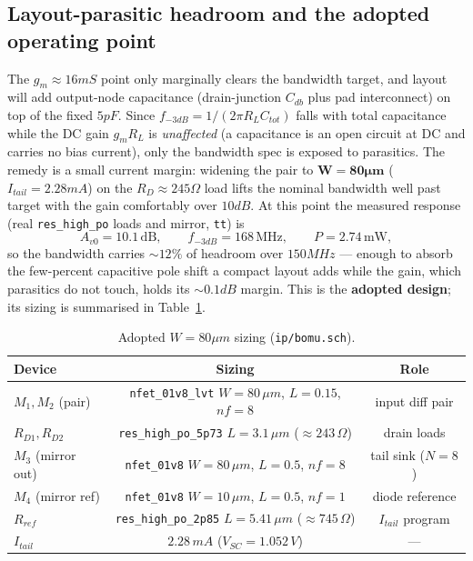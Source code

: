 \documentclass{article}
\begin{document}
\subsection{Layout-parasitic headroom and the adopted operating point}
\label{sec:parasitic}
The $g_m\!\approx\!16mS$ point only marginally clears the bandwidth target, and layout
will add output-node capacitance (drain-junction $C_{db}$ plus pad interconnect) on top
of the fixed $5pF$. Since $f_{-3dB}=1/(2\pi R_L C_{tot})$ falls with total capacitance
while the DC gain $g_m R_L$ is \emph{unaffected} (a capacitance is an open circuit at DC
and carries no bias current), only the bandwidth spec is exposed to parasitics. The
remedy is a small current margin: widening the pair to $\mathbf{W=80\mu m}$
($I_{tail}=2.28mA$) on the $R_D\approx245\Omega$ load lifts the nominal bandwidth well
past target with the gain comfortably over $10dB$. At this point the measured response
(real \texttt{res\_high\_po} loads and mirror, \texttt{tt}) is
\begin{equation}
    A_{v0}=10.1\,\mathrm{dB}, \qquad f_{-3dB}=168\,\mathrm{MHz},
    \qquad P=2.74\,\mathrm{mW},
\end{equation}
so the bandwidth carries $\sim12\%$ of headroom over $150MHz$ --- enough to absorb the
few-percent capacitive pole shift a compact layout adds while the gain, which
parasitics do not touch, holds its $\sim0.1dB$ margin. This is the \textbf{adopted
design}; its sizing is summarised in Table~\ref{tab:finalsize}.

\begin{table}[H]
    \centering
    \caption{Adopted $W=80\mu m$ sizing (\texttt{ip/bomu.sch}).}
    \label{tab:finalsize}
    \begin{tabular}{l|c|c} \hline
        \textbf{Device} & \textbf{Sizing} & \textbf{Role} \\ \hline
        $M_1,M_2$ (pair) & \texttt{nfet\_01v8\_lvt} $W{=}80\,\mu m$, $L{=}0.15$, $nf{=}8$ & input diff pair \\ \hline
        $R_{D1},R_{D2}$ & \texttt{res\_high\_po\_5p73} $L{=}3.1\,\mu m$ ($\approx243\,\Omega$) & drain loads \\ \hline
        $M_3$ (mirror out) & \texttt{nfet\_01v8} $W{=}80\,\mu m$, $L{=}0.5$, $nf{=}8$ & tail sink ($N{=}8$) \\ \hline
        $M_4$ (mirror ref) & \texttt{nfet\_01v8} $W{=}10\,\mu m$, $L{=}0.5$, $nf{=}1$ & diode reference \\ \hline
        $R_{ref}$ & \texttt{res\_high\_po\_2p85} $L{=}5.41\,\mu m$ ($\approx745\,\Omega$) & $I_{tail}$ program \\ \hline
        $I_{tail}$ & $2.28\,mA$ ($V_{SC}=1.052\,V$) & --- \\ \hline
    \end{tabular}
\end{table}
\end{document}
